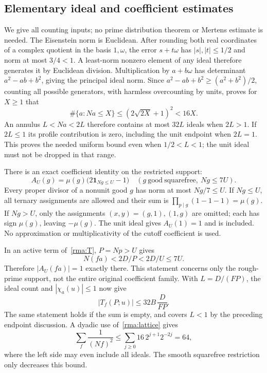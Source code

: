 \documentclass[11pt]{article}
\theoremstyle{definition}\newtheorem{definition}[theorem]{Definition}
\theoremstyle{remark}\newtheorem{remark}[theorem]{Remark}
\begin{document}
\subsection{Elementary ideal and coefficient estimates}
We give all counting inputs; no prime distribution theorem or Mertens
estimate is needed. The Eisenstein norm is Euclidean. After rounding
both real coordinates of a complex quotient in the basis $1,\omega$,
the error $s+t\omega$ has $|s|,|t|\le1/2$ and norm at most $3/4<1$.
A least-norm nonzero element of any ideal therefore generates it by
Euclidean division. Multiplication by $a+b\omega$ has determinant
$a^2-ab+b^2$, giving the principal ideal norm. Since
$a^2-ab+b^2\ge(a^2+b^2)/2$, counting all possible generators, with
harmless overcounting by units, proves for $X\ge1$ that
\begin{equation}\label{rma:lattice}
 \#\{a:Na\le X\}\le(2\sqrt{2X}+1)^2<16X.
\end{equation}
An annulus $L<Na<2L$ therefore contains at most $32L$ ideals when
$2L>1$. If $2L\le1$ its profile contribution is zero, including the
unit endpoint when $2L=1$. This proves the needed uniform bound even
when $1/2<L<1$; the unit ideal must not be dropped in that range.

There is an exact coefficient identity on the restricted support:
\begin{equation}\label{rma:coefficient}
 A_U(g)=\mu(g)\bigl(2\mathbf1_{Ng\le U}-1\bigr)
 \quad(g\ \mathrm{good\ squarefree},\ Ng\le7U).
\end{equation}
Every proper divisor of a nonunit good $g$ has norm at most $Ng/7\le U$.
If $Ng\le U$, all ternary assignments are allowed and their sum is
$\prod_{p\mid g}(1-1-1)=\mu(g)$. If $Ng>U$, only the assignments
$(x,y)=(g,1),(1,g)$ are omitted; each has sign $\mu(g)$, leaving
$-\mu(g)$. The unit ideal gives $A_U(1)=1$ and is included.
No approximation or multiplicativity of the cutoff coefficient is used.

In an active term of~\eqref{rma:T}, $P=Np>U$ gives
\[
 N(fa)<2D/P<2D/U\le7U.
\]
Therefore $|A_U(fa)|=1$ exactly there. This statement concerns only the
rough-prime support, not the entire original coefficient family.
With $L=D/(FP)$, the ideal count and $|\chi_a(u)|\le1$ now give
\begin{equation}\label{rma:Tbound}
 |T_f(P;u)|\le32B\,\frac{D}{FP}.
\end{equation}
The same statement holds if the sum is empty, and covers $L<1$ by the
preceding endpoint discussion. A dyadic use of~\eqref{rma:lattice} gives
\begin{equation}\label{rma:fsum}
 \sum_f\frac1{(Nf)^2}
 \le\sum_{j\ge0}16\,2^{j+1}2^{-2j}=64,
\end{equation}
where the left side may even include all ideals. The smooth squarefree
restriction only decreases this bound.
\end{document}
